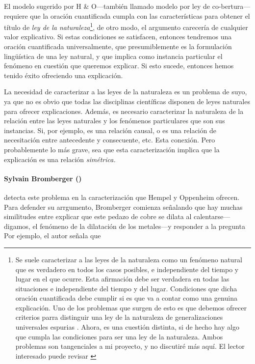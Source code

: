 El modelo sugerido por H \& O---también llamado modelo por
ley de co-bertura---requiere que la oración cuantificada
cumpla con las características para obtener el título de
\emph{ley de la naturaleza}\footnote{ 
  Se suele caracterizar a las leyes de la naturaleza como un
  fenómeno natural que es verdadero en todos los casos
  posibles, e	independiente del tiempo y lugar en el que
  ocurre. Esta afirmación debe ser verdadera en todas las
  situaciones e independiente del tiempo y del lugar.
  Condiciones que dicha oración cuantificada debe	cumplir si
  es que va a contar como una genuina explicación. Uno de
  los problemas que surgen de esto es que debemos ofrecer
  criterios parra distinguir una ley de la naturaleza de
  generalizaciones	universales espurias
  \parencite{Nagel1962}. Ahora, es una cuestión distinta, si
  de hecho hay algo que cumpla las condiciones para ser una
  ley de la naturaleza. Ambos problemas son tangenciales a
  mi	proyecto, y no discutiré más aquí. El lector
  interesado puede revisar	\parencite{sep-laws-of-nature}
}, 
de otro modo, el argumento carecería de cualquier valor
explicativo. Si estas condiciones se satisfacen, entonces
tendremos una oración cuantificada universalmente, que
presumiblemente es la formulación lingüística de una ley
natural, y que implica como instancia particular el fenómeno
en cuestión que queremos explicar. Si esto sucede, entonces
hemos tenido éxito ofreciendo una explicación.

La necesidad de caracterizar a las leyes de la naturaleza es
un problema de suyo, ya que no es obvio que todas las
disciplinas científicas  disponen de leyes naturales para
ofrecer explicaciones. Además, es necesario caracterizar la
naturaleza de la relación entre las leyes naturales y los
fenómenos particulares que son sus instancias. Si, por
ejemplo, es una relación causal, o es una relación de
necesitación entre antecedente y consecuente, etc. Esta
conexión. Pero probablemente lo más grave, sea que esta
caracterización implica que la explicación es una relación
\emph{simétrica.}


\paragraph{Sylvain Bromberger (\citeyear{Bromberger1966})}
detecta este problema en la caracterización que Hempel y
Oppenheim ofrecen. Para defender su arrgumento, Bromberger
comienza señalando que hay muchas similitudes entre explicar
que este pedazo de cobre se dilata al calentarse---digamos, 
el fenómeno de la dilatación de los metales---y responder a
la pregunta  Por ejemplo, el autor señala que

